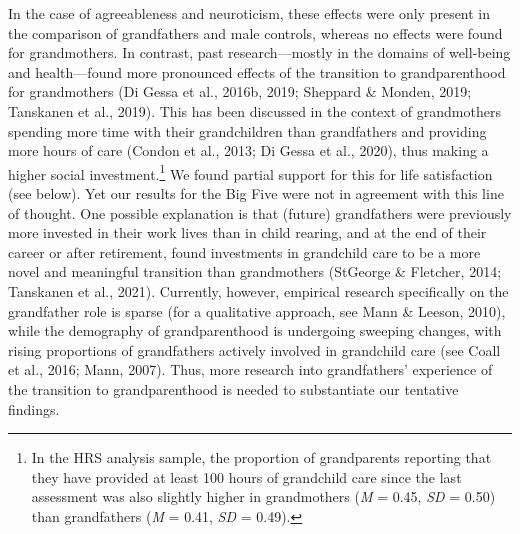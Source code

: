 \documentclass[
  english,
  man, noextraspace,floatsintext]{apa7}
\begin{document}
In the case of agreeableness and neuroticism, these effects were only present in the comparison of grandfathers and male controls, whereas no effects were found for grandmothers. In contrast, past research---mostly in the domains of well-being and health---found more pronounced effects of the transition to grandparenthood for grandmothers (Di Gessa et al., 2016b, 2019; Sheppard \& Monden, 2019; Tanskanen et al., 2019). This has been discussed in the context of grandmothers spending more time with their grandchildren than grandfathers and providing more hours of care (Condon et al., 2013; Di Gessa et al., 2020), thus making a higher social investment.\footnote{In the HRS analysis sample, the proportion of grandparents reporting that they have provided at least 100 hours of grandchild care since the last assessment was also slightly higher in grandmothers (\emph{M} = 0.45, \emph{SD} = 0.50) than grandfathers (\emph{M} = 0.41, \emph{SD} = 0.49).} We found partial support for this for life satisfaction (see below). Yet our results for the Big Five were not in agreement with this line of thought. One possible explanation is that (future) grandfathers were previously more invested in their work lives than in child rearing, and at the end of their career or after retirement, found investments in grandchild care to be a more novel and meaningful transition than grandmothers (StGeorge \& Fletcher, 2014; Tanskanen et al., 2021). Currently, however, empirical research specifically on the grandfather role is sparse (for a qualitative approach, see Mann \& Leeson, 2010), while the demography of grandparenthood is undergoing sweeping changes, with rising proportions of grandfathers actively involved in grandchild care (see Coall et al., 2016; Mann, 2007). Thus, more research into grandfathers' experience of the transition to grandparenthood is needed to substantiate our tentative findings.\\
\end{document}
